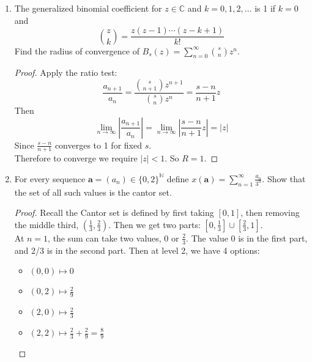 \documentclass[hidelinks,12pt]{article}
\newcommand{\N}{\mathbb{N}}
\newcommand{\C}{\mathbb{C}}
\begin{document}
\begin{enumerate}
\begin{proof}
\[   \]
  We have \(a_{n}=f_{n}\), and by above, \(\limsup_{n\to\infty}|f_{n}|^{1/n}=\varphi\). Thus \(R=\frac{1}{\varphi}\).\\
  Let \(|z|<R\), then \[
      f(z)=\sum_{n=0}^{\infty}f_{n}z^{n}=1+f_{1}z+\sum_{n=2}^{\infty}(f_{n-1}+f_{n-2})z^{n}
  \]
 Split the sum:
\[
=1+f_{1}z+\sum_{n=2}^{\infty}a_{n-1}z^{n}+\sum_{n=2}^{\infty}a_{n-2}z^{n}
\]
Pull out \(z\) from the first sum, and \(z^{2}\) from the second:
\[
=1+f_{1}z+z \sum_{n=2}^{\infty}a_{n-1}z^{n-1}+z^{2}\sum_{n=2}^{\infty}a_{n-2}z^{n-2}
\]
Now each sum is exactly \(f(z)\), so \[
=1+zf(z)+z^{2}f(z)\implies f(z)=\frac{1}{1-z-z^{2}}
\]
As required
   \end{proof} 
    \item The generalized binomial coefficient for \(z\in\C\) and \(k=0,1,2,\dots\) is 1 if \(k=0\) and \[
            \binom{z}{k}=\frac{z(z-1)\cdots (z-k+1)}{k!}
    \]
    Find the radius of convergence of \(B_{s}(z)=\sum_{n=0}^{\infty}\binom{s}{n}z^{n}\). 
    \begin{proof}
   Apply the ratio test: \[
       \frac{a_{n+1}}{a_{n}}=\frac{\binom{s}{n+1}z^{n+1}}{\binom{s}{n}z^{n}}=\frac{s-n}{n+1}z
   \]
   Then \[
   \lim_{n\to\infty}|\frac{a_{n+1}}{a_{n}}|=\lim_{n\to\infty}\left| \frac{s-n}{n+1}z\right|=|z|
   \]
   Since \(\frac{s-n}{n+1}\) converges to 1 for fixed \(s\).\\ Therefore to converge we require \(|z|<1\). So \(R=1\).
    \end{proof}
    \item For every sequence \(\mathbf{a}=(a_{n})\in\{0,2\}^{\N}\) define \(x(\mathbf{a})=\sum_{n=1}^{\infty}\frac{a_{n}}{3^{n}}\). Show that the set of all such values is the cantor set. 
        \begin{proof}
            Recall the Cantor set is defined by first taking \([0,1]\), then removing the middle third, \((\frac{1}{3},\frac{2}{3})\). Then we get two parts: \([0,\frac{1}{3}]\cup[\frac{2}{3},1]\).\\
            At \(n=1\), the sum can take two values, \(0\text{ or }\frac{2}{3}\). The value 0 is in the first part, and 2/3 is in the second part. Then at level 2, we have 4 options: 
            \begin{itemize}
                \item \( (0,0)\mapsto0\) 
                \item \((0,2)\mapsto \frac{2}{9}\) 
                \item \((2,0)\mapsto \frac{2}{3}\) 
                \item \((2,2)\mapsto \frac{2}{3}+\frac{2}{9}=\frac{8}{9}\) 

\end{itemize}
\end{proof}
\end{enumerate}
\end{document}
